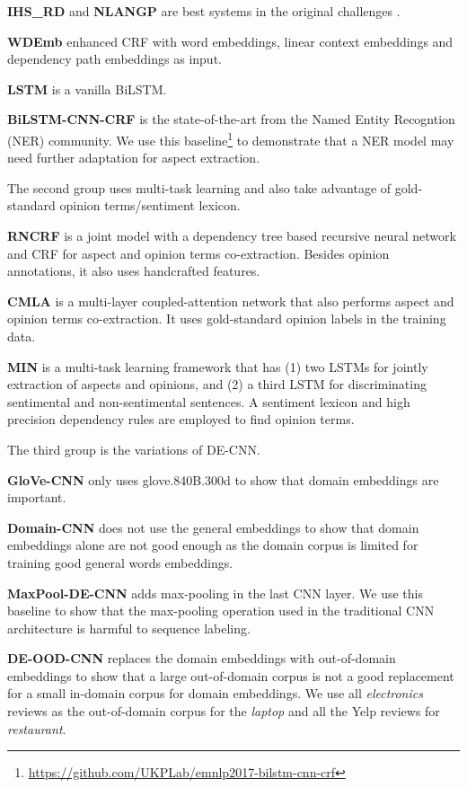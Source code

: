 \documentclass[11pt,a4paper]{article}
\begin{document}
\textbf{IHS\_RD} \cite{chernyshevich2014ihs} and \textbf{NLANGP} \cite{toh2016nlangp} are best systems in the original challenges \cite{pontiki2014SemEval,pontiki2016semeval}.

\textbf{WDEmb} \cite{yin2016unsupervised} enhanced CRF with word embeddings, linear context embeddings and dependency path embeddings as input.

\textbf{LSTM} \cite{liu2015fine,li2017deep} is a vanilla BiLSTM.

\textbf{BiLSTM-CNN-CRF} \cite{Reimers:2017:EMNLP} is the state-of-the-art from the Named Entity Recogntion (NER) community. We use this baseline\footnote{\url{https://github.com/UKPLab/emnlp2017-bilstm-cnn-crf} } to demonstrate that a NER model may need further adaptation for aspect extraction.

The second group uses multi-task learning and also take advantage of gold-standard opinion terms/sentiment lexicon.

\textbf{RNCRF} \cite{wang2016recursive} is a joint model with a dependency tree based recursive neural network and CRF for aspect and opinion terms co-extraction. 
Besides opinion annotations, it also uses handcrafted features.

\textbf{CMLA} \cite{wang2017coupled} is a multi-layer coupled-attention network that also performs aspect and opinion terms co-extraction. It uses gold-standard opinion labels in the training data.

\textbf{MIN} \cite{li2017deep} is a multi-task learning framework that has (1) two LSTMs for jointly extraction of aspects and opinions, and (2) a third LSTM for discriminating sentimental and non-sentimental sentences. 
A sentiment lexicon and high precision dependency rules are employed to find opinion terms. 

The third group is the variations of DE-CNN.

\textbf{GloVe-CNN} only uses glove.840B.300d to show that domain embeddings are important. 

\textbf{Domain-CNN} does not use the general embeddings to show that domain embeddings alone are not good enough as the domain corpus is limited for training good general words embeddings.

\textbf{MaxPool-DE-CNN} adds max-pooling in the last CNN layer. We use this baseline to show that the max-pooling operation used in the traditional CNN architecture is harmful to sequence labeling.

\textbf{DE-OOD-CNN} replaces the domain embeddings with out-of-domain embeddings to show that a large out-of-domain corpus is not a good replacement for a small in-domain corpus for domain embeddings.
We use all \textit{electronics} reviews as the out-of-domain corpus for the \textit{laptop} and all the Yelp reviews for \textit{restaurant}.
\end{document}
